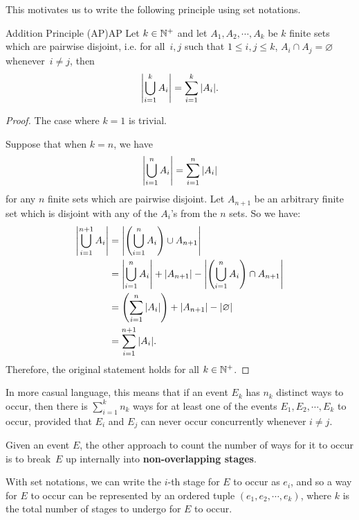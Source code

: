 \documentclass[math]{amznotes}
\theoremstyle{remark}
\newcommand{\0}{\mathbf{0}}
\newcommand{\1}{\mathbf{1}}
\begin{document}
This motivates us to write the following principle using set notations.
\begin{thmbox}{Addition Principle (AP)}{AP}
    Let $k \in \mathbb{N}^+$ and let $A_1, A_2, \cdots, A_k$ be $k$ finite sets which are pairwise disjoint, i.e. for all~$i, j$ such that $1 \leq i, j \leq k$, $A_i \cap A_j = \varnothing$ whenever~$i \neq j$, then
   \begin{equation*}
        {\left\lvert {\bigcup_{i = 1}^k A_i} \right\rvert} = \sum_{i = 1}^{k}{\left\lvert {A_i} \right\rvert}.
   \end{equation*} 
   \tcblower
   \begin{proof}
        The case where $k = 1$ is trivial.

        Suppose that when $k = n$, we have
        \begin{equation*}
            {\left\lvert {\bigcup_{i = 1}^n A_i} \right\rvert} = \sum_{i = 1}^{n}{\left\lvert {A_i} \right\rvert}
        \end{equation*} 
        for any $n$ finite sets which are pairwise disjoint. Let $A_{n + 1}$ be an arbitrary finite set which is disjoint with any of the $A_i$'s from the $n$ sets. So we have:
        \begin{align*}
            {\left\lvert {\bigcup_{i = 1}^{n + 1} A_i} \right\rvert} & = {\left\lvert {\left(\bigcup_{i = 1}^n A_i\right) \cup A_{n + 1}} \right\rvert} \\
            & = {\left\lvert {\bigcup_{i = 1}^n A_i} \right\rvert} + {\left\lvert {A_{n + 1}} \right\rvert} - {\left\lvert {\left(\bigcup_{i = 1}^n A_i\right) \cap A_{n + 1}} \right\rvert} \\
            & = \left(\sum_{i = 1}^{n}{\left\lvert {A_i} \right\rvert}\right) + {\left\lvert {A_{n + 1}} \right\rvert} - {\left\lvert {\varnothing} \right\rvert} \\
            & = \sum_{i = 1}^{n + 1}{\left\lvert {A_i} \right\rvert}.
        \end{align*}
        Therefore, the original statement holds for all $k \in \mathbb{N}^+$.
   \end{proof}
\end{thmbox}
\begin{notebox}
    In more casual language, this means that if an event $E_k$ has $n_k$ distinct ways to occur, then there is $\sum_{i = 1}^{k}n_k$ ways for at least one of the events $E_1, E_2, \cdots, E_k$ to occur, provided that $E_i$ and $E_j$ can never occur concurrently whenever $i \neq j$.
\end{notebox}
Given an event $E$, the other approach to count the number of ways for it to occur is to break~$E$ up internally into \textbf{non-overlapping stages}.

With set notations, we can write the $i$-th stage for $E$ to occur as $e_i$, and so a way for $E$ to occur can be represented by an ordered tuple $(e_1, e_2, \cdots, e_k)$, where $k$ is the total number of stages to undergo for $E$ to occur.
\end{document}

